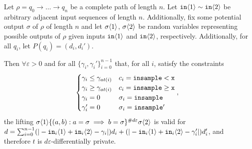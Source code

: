 \begin{lemma}\label{multTransitionsCouplingProof}
    Let $\rho = q_0\to \ldots \to q_n$ be a complete path of length $n$. 
    Let $\texttt{in}\brangle{1}\sim \texttt{in}\brangle{2}$ be arbitrary adjacent input sequences of length $n$. Additionally, fix some potential output $\sigma$ of $\rho$ of length $n$ and let $\sigma\brangle{1}$, $\sigma\brangle{2}$ be random variables representing possible outputs of $\rho$ given inputs $\texttt{in}\brangle{1}$ and $\texttt{in}\brangle{2}$, respectively. Additionally, for all $q_i$, let $P(q_i) = (d_i, d_i')$.

    Then $\forall \varepsilon>0$ and for all $\{\gamma_i, \gamma_i'\}_{i=0}^{n-1}$ that, for all $i$, satisfy the constraints \[
        \begin{cases}
          \gamma_i\leq\gamma_{at(i)} & c_i = \lguard[\texttt{x}]\\
          \gamma_i\geq\gamma_{at(i)} & c_i = \gguard[\texttt{x}]\\
          \gamma_i=0 & \sigma_i = \texttt{insample}\\
          \gamma_i'=0 & \sigma_i = \texttt{insample}'
        \end{cases},
      \]
      the lifting $\sigma\brangle{1}\{(a, b): a=\sigma\implies b=\sigma\}^{\#d\varepsilon}\sigma\brangle{2}$ is valid for $d = \sum_{i=0}^{n-1}(|-\texttt{in}_i\brangle{1}+\texttt{in}_i\brangle{2}-\gamma_i|)d_i+(|-\texttt{in}_i\brangle{1}+\texttt{in}_i\brangle{2}-\gamma_i'|)d_i'$, and therefore $t$ is $d\varepsilon$-differentially private. 
\end{lemma}
